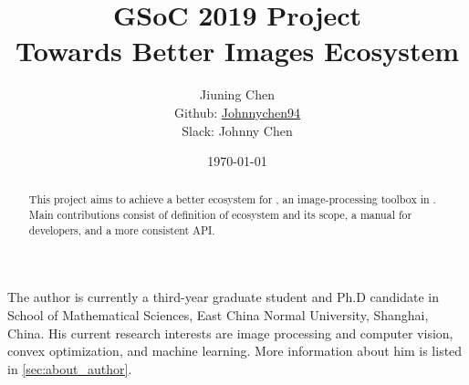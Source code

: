 \documentclass[12pt, a4paper]{article}
\title{GSoC 2019 Project\\Towards Better Images Ecosystem}
\author{Jiuning Chen\mailto{johnnychen94@hotmail.com}\\
Github: \href{https://github.com/johnnychen94}{Johnnychen94}\\
Slack: Johnny Chen
}
\date{\today}
\begin{document}
\maketitle

\renewcommand\abstractname{Abstract}
\begin{abstract}
    This project aims to achieve a better ecosystem for \href{https://juliaimages.org/latest/}{\images}, an image-processing toolbox in \href{https://julialang.org/}{\langjulia}. Main contributions consist of definition of \images{} ecosystem and its scope, a manual for developers, and a more consistent API.
\end{abstract}

\noindent The author is currently a third-year graduate student and Ph.D candidate in School of Mathematical Sciences, East China Normal University, Shanghai, China. His current research interests are image processing and computer vision, convex optimization, and machine learning. More information about him is listed in \cref{sec:about_author}.\par






\end{document}
